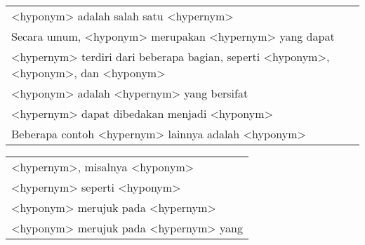 \begin{table}
\begin{tabular}{|m{32em}|}
      <hyponym> adalah salah satu <hypernym> \\ 
      Secara umum, <hyponym> merupakan <hypernym> yang dapat \\ 
      <hypernym> terdiri dari beberapa bagian, seperti <hyponym>, <hyponym>, dan <hyponym> \\ 
      <hyponym> adalah <hypernym> yang bersifat \\ 
      <hypernym> dapat dibedakan menjadi <hyponym> \\ 
      Beberapa contoh <hypernym> lainnya adalah <hyponym> \\  \hline
  \end{tabular}
\end{table}
\begin{table}
  \centering
  \label{table:patternmanual}
  \begin{tabular}{|m{32em}|}
    \hline
      <hypernym>, misalnya <hyponym> \\
      <hypernym> seperti <hyponym> \\ 
      <hyponym> merujuk pada <hypernym> \\ 
      <hyponym> merujuk pada <hypernym> yang \\ \hline
  \end{tabular}
\end{table}



